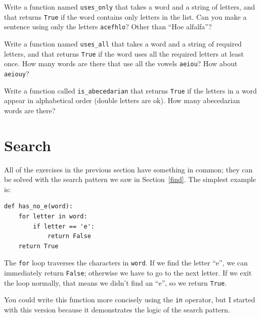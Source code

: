\documentclass[10pt]{book}
\begin{document}
\begin{exercise}

Write a function named \verb"uses_only" that takes a word and a
string of letters, and that returns {\tt True} if the word contains
only letters in the list.  Can you make a sentence using only the
letters {\tt acefhlo}?  Other than ``Hoe alfalfa''?

\end{exercise}


\begin{exercise}

Write a function named \verb"uses_all" that takes a word and a
string of required letters, and that returns {\tt True} if the word
uses all the required letters at least once.  How many words are there
that use all the vowels {\tt aeiou}?  How about {\tt aeiouy}?

\end{exercise}


\begin{exercise}

Write a function called \verb"is_abecedarian" that returns
{\tt True} if the letters in a word appear in alphabetical order
(double letters are ok).
How many abecedarian words are there?


\end{exercise}



\section{Search}
\label{search}

All of the exercises in the previous section have something
in common; they can be solved with the search pattern we saw
in Section~\ref{find}.  The simplest example is:

\begin{verbatim}
def has_no_e(word):
    for letter in word:
        if letter == 'e':
            return False
    return True
\end{verbatim}
%
The {\tt for} loop traverses the characters in {\tt word}.  If we find
the letter ``e'', we can immediately return {\tt False}; otherwise we
have to go to the next letter.  If we exit the loop normally, that
means we didn't find an ``e'', so we return {\tt True}.

You could write this function more concisely using the {\tt in}
operator, but I started with this version because it
demonstrates the logic of the search pattern.
\end{document}

